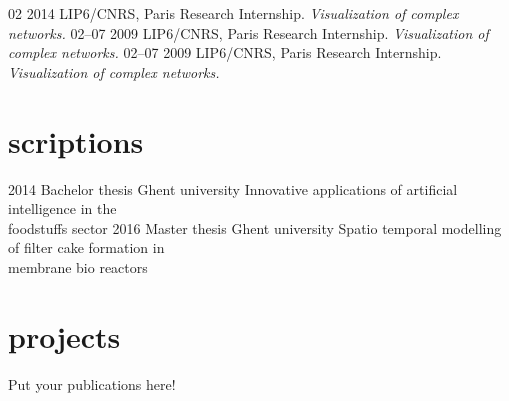 \documentclass[]{friggeri-cv}
\begin{document}
\begin{entrylist}
  \entry
    {02 2014}
    {LIP6/CNRS, Paris}
    {Research Internship.}
    {\emph{Visualization of complex networks.}}
  \entry
    {02–07 2009}
    {LIP6/CNRS, Paris}
    {Research Internship.}
    {\emph{Visualization of complex networks.}}
 \entry
    {02–07 2009}
    {LIP6/CNRS, Paris}
    {Research Internship.}
    {\emph{Visualization of complex networks.}}
 
    
\end{entrylist}

\section{scriptions}

\begin{entrylist}
  \entry
    {2014}
    {Bachelor thesis}
    {Ghent university}
    {Innovative applications of artificial intelligence in the\\ foodstuffs sector}
  \entry
    {2016}
    {Master thesis}
    {Ghent university}
    {Spatio temporal modelling of filter cake formation in \\ membrane bio reactors}
  
\end{entrylist}

\section{projects}

Put your publications here!

% 
\end{document}
